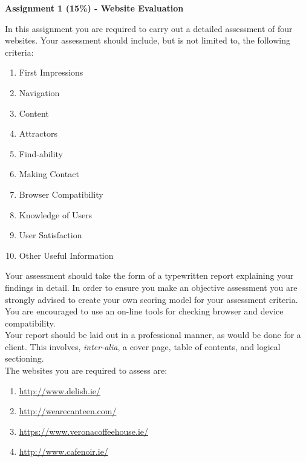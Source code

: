 
	
\begin{flushleft}
\Large\textbf{Assignment 1 (15\%) - Website Evaluation}\\
\end{flushleft}

In this assignment you are required to carry out a detailed assessment of four websites. Your assessment should include, but is not limited to, the following criteria:


\begin{enumerate}
	\item First Impressions
	\item Navigation
	\item Content
	\item Attractors
	\item Find-ability
	\item Making Contact
	\item Browser Compatibility
	\item Knowledge of Users
	\item User Satisfaction
	\item Other Useful Information
\end{enumerate}

Your assessment should take the form of a typewritten report explaining your findings in detail. In order to ensure you make an objective assessment you are strongly advised to create your own scoring model for your assessment criteria. You are encouraged to use an on-line tools for checking browser and device compatibility.\\

Your report should be laid out in a professional manner, as would be done for a client. This involves, \textit{inter-alia}, a cover page, table of contents, and logical sectioning.\\

The websites you are required to assess are:\\

\begin{enumerate}
	\item \href{http://www.delish.ie/}{http://www.delish.ie/}
	\item \href{http://wearecanteen.com/}{http://wearecanteen.com/}
	\item \href{https://www.veronacoffeehouse.ie/}{https://www.veronacoffeehouse.ie/}
	\item \href{http://www.cafenoir.ie/}{http://www.cafenoir.ie/}
\end{enumerate}


